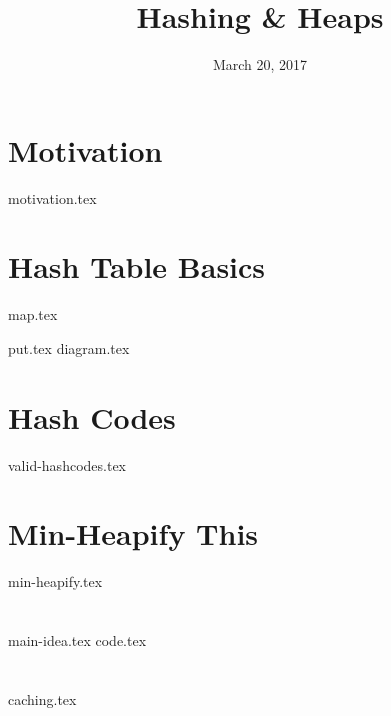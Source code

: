 \documentclass[11pt]{exam}
\title{Hashing \& Heaps}
\date{March 20, 2017}
\begin{document}
\maketitle

\section{Motivation}
\begin{questions}
{motivation.tex}
\end{questions}

\clearpage

\section{Hash Table Basics}
{map.tex}
\begin{questions}
{put.tex}
{diagram.tex}
\end{questions}

\clearpage

\section{Hash Codes}
\begin{questions}
{valid-hashcodes.tex}
\end{questions}

\clearpage

\section{Min-Heapify This}
\begin{questions}
{min-heapify.tex}
\end{questions}

\clearpage

\section{}
\begin{questions}
{main-idea.tex}
{code.tex}
\end{questions}

\clearpage

\section{}
\begin{questions}
{caching.tex}
\end{questions}
\end{document}

